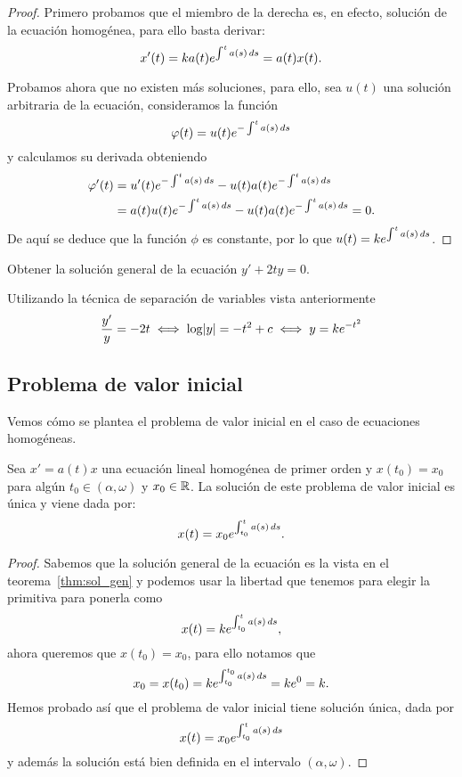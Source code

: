 \documentclass[../ecuaciones_diferenciales.tex]{subfiles}
\begin{document}
\begin{proof}
	Primero probamos que el miembro de la derecha es, en efecto,
	solución de la ecuación homogénea, para ello basta derivar:
	\[x'(t) = k a(t) e^{\int^t a(s) \mathop{d\!} s} = a(t) x(t).\]

	Probamos ahora que no existen más soluciones, para ello, sea \(u(t)\) una
	solución arbitraria de la ecuación, consideramos la función
	\[\varphi(t) = u(t) e^{-\int^t a(s) \mathop{d\!} s}\]
	y calculamos su derivada obteniendo
	\begin{align*}
		\varphi'(t) & = u'(t) e^{-\int^t a(s) \mathop{d\!} s}
		- u(t) a(t) e^{-\int^t a(s) \mathop{d\!} s}            \\
		         & = a(t) u(t) e^{-\int^t a(s) \mathop{d\!} s}
		- u(t) a(t) e^{-\int^t a(s) \mathop{d\!} s} = 0.
	\end{align*}
	De aquí se deduce que la función \(\phi\) es constante, por lo que
	\(u(t) = k e^{\int^t a(s) \mathop{d\!} s}\).
\end{proof}

\begin{example}
	Obtener la solución general de la ecuación \(y' + 2ty = 0\).
\end{example}

\begin{solution}
	Utilizando la técnica de separación de variables vista anteriormente
	\[\frac{y'}{y} = -2t \iff \log\abs{y} = -t^2 + c \iff y = k e^{-t^2}\]
\end{solution}

\subsection{Problema de valor inicial} \label{sec:pvi}

Vemos cómo se plantea el problema de valor inicial en el caso de ecuaciones
homogéneas.

\begin{theorem}
	Sea \(x' = a(t)x\) una ecuación lineal homogénea de primer orden y 
	\(x(t_0) = x_0\) para algún \(t_0 \in (\alpha, \omega)\) y \(x_0 \in \mathbb{R}\).
	La solución de este problema de valor inicial es única y viene dada por:
	\[x(t) = x_0 e^{\int_{t_0}^t a(s) \mathop{d\!} s}.\]
\end{theorem}

\begin{proof}
	Sabemos que la solución general de la ecuación es la 
	vista en el teorema~\ref{thm:sol_gen} y podemos usar la libertad que 
	tenemos para elegir la primitiva para ponerla como
	\[x(t) = k e^{\int_{t_0}^t a(s) \mathop{d\!} s},\]
	ahora queremos que \(x(t_0) = x_0\), para ello notamos que
	\[x_0 = x(t_0) = k e^{\int_{t_0}^{t_0} a(s) \mathop{d\!} s} = ke^0 = k.\]
	Hemos probado así que el problema de valor inicial tiene solución única,
	dada por
	\[x(t) = x_0 e^{\int_{t_0}^t a(s) \mathop{d\!} s}\]
	y además la solución está bien definida en el intervalo 
	\((\alpha, \omega)\).
\end{proof}
\end{document}
